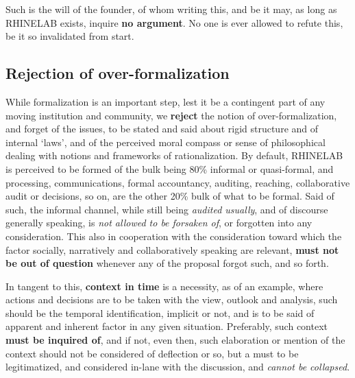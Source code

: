 \documentclass[10pt,a4paper]{article}
\begin{document}
Such is the will of the founder, of whom writing this, and be it may, as long as RHINELAB exists, inquire \textbf{no argument}. No one is ever allowed to refute this, be it so invalidated from start. 

\subsection{Rejection of over-formalization}

While formalization is an important step, lest it be a contingent part of any moving institution and community, we \textbf{reject} the notion of over-formalization, and forget of the issues, to be stated and said about rigid structure and of internal `laws', and of the perceived moral compass or sense of philosophical dealing with notions and frameworks of rationalization. By default, RHINELAB is perceived to be formed of the bulk being 80\% informal or quasi-formal, and processing, communications, formal accountancy, auditing, reaching, collaborative audit or decisions, so on, are the other 20\% bulk of what to be formal. Said of such, the informal channel, while still being \textit{audited usually}, and of discourse generally speaking, is \textit{not allowed to be forsaken of}, or forgotten into any consideration. This also in cooperation with the consideration toward which the factor socially, narratively and collaboratively speaking are relevant, \textbf{must not be out of question} whenever any of the proposal forgot such, and so forth. 

In tangent to this, \textbf{context in time} is a necessity, as of an example, where actions and decisions are to be taken with the view, outlook and analysis, such should be the temporal identification, implicit or not, and is to be said of apparent and inherent factor in any given situation. Preferably, such context \textbf{must be inquired of}, and if not, even then, such elaboration or mention of the context should not be considered of deflection or so, but a must to be legitimatized, and considered in-lane with the discussion, and \textit{cannot be collapsed}. 
\end{document}
